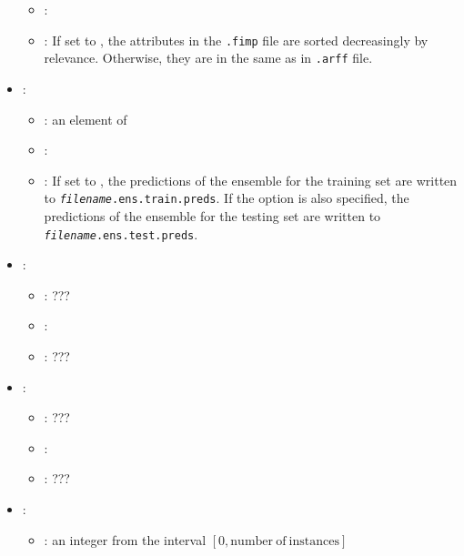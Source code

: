 \begin{itemize}
\begin{itemize}
                \item \optionDefaultValue{}: 
                \item \optionDescrption{}: If set to , the attributes in the \texttt{.fimp} file are sorted decreasingly by relevance. Otherwise, they are in the same as in \texttt{.arff} file.
           \end{itemize}
    \item {}:
           \begin{itemize}
                \item \optionPossibleValues{}: an element of 
                \item \optionDefaultValue{}: 
                \item \optionDescrption{}: If set to , the predictions of the ensemble for the training set are written to \texttt{{\em filename}.ens.train.preds}.
                If the option  is also specified,  the predictions of the ensemble for the testing set are written to \texttt{{\em filename}.ens.test.preds}.
           \end{itemize}
    \item {}:
           \begin{itemize}
                \item \optionPossibleValues{}: ???
                \item \optionDefaultValue{}: 
                \item \optionDescrption{}: ???
           \end{itemize}
    \item {}:
           \begin{itemize}
                \item \optionPossibleValues{}: ???
                \item \optionDefaultValue{}: 
                \item \optionDescrption{}: ???
           \end{itemize}
    \item {}:
           \begin{itemize}
                \item \optionPossibleValues{}: an integer from the interval $[0, \mathrm{number\ of\ instances}]$

\end{itemize}
\end{itemize}
